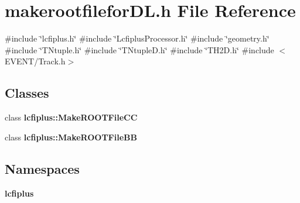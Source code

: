 \section{makerootfilefor\+D\+L.\+h File Reference}
\label{makerootfileforDL_8h}
{\ttfamily \#include \char`\"{}lcfiplus.\+h\char`\"{}}\newline
{\ttfamily \#include \char`\"{}Lcfiplus\+Processor.\+h\char`\"{}}\newline
{\ttfamily \#include \char`\"{}geometry.\+h\char`\"{}}\newline
{\ttfamily \#include \char`\"{}T\+Ntuple.\+h\char`\"{}}\newline
{\ttfamily \#include \char`\"{}T\+Ntuple\+D.\+h\char`\"{}}\newline
{\ttfamily \#include \char`\"{}T\+H2\+D.\+h\char`\"{}}\newline
{\ttfamily \#include $<$E\+V\+E\+N\+T/\+Track.\+h$>$}\newline
\subsection*{Classes}
\begin{DoxyCompactItemize}
\item 
class \textbf{ lcfiplus\+::\+Make\+R\+O\+O\+T\+File\+CC}
\item 
class \textbf{ lcfiplus\+::\+Make\+R\+O\+O\+T\+File\+BB}
\end{DoxyCompactItemize}
\subsection*{Namespaces}
\begin{DoxyCompactItemize}
\item 
 \textbf{ lcfiplus}
\end{DoxyCompactItemize}
